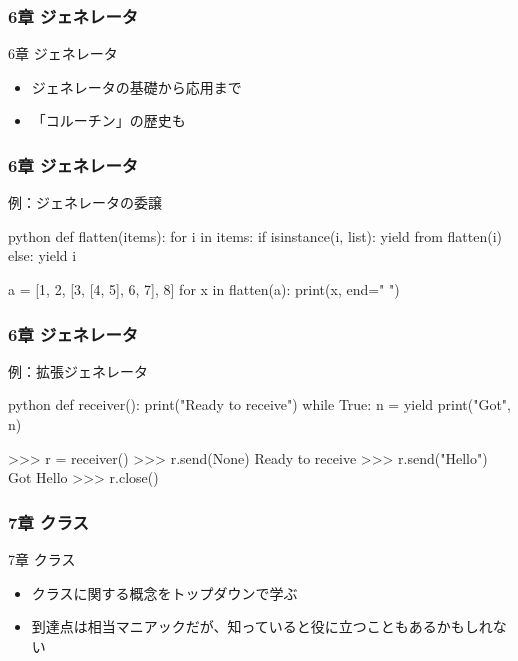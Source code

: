 \documentclass[aspectratio=169,dvipdfmx,12pt,notheorems]{beamer}
\theoremstyle{definition}
\begin{document}
\begin{frame}\frametitle{6章 ジェネレータ}

\begin{block}{6章 ジェネレータ}
\begin{itemize}
\item ジェネレータの基礎から応用まで
\item 「コルーチン」の歴史も
\end{itemize}
\end{block}

\end{frame}

\begin{frame}[fragile]\frametitle{6章 ジェネレータ}

\begin{exampleblock}{例：ジェネレータの委譲}
\begin{pygments}{python}    
def flatten(items):
    for i in items:
        if isinstance(i, list):
            yield from flatten(i)
        else:
            yield i

a = [1, 2, [3, [4, 5], 6, 7], 8]
for x in flatten(a):
    print(x, end=" ")
\end{pygments}
\end{exampleblock}

\end{frame}

\begin{frame}[fragile]\frametitle{6章 ジェネレータ}

\begin{exampleblock}{例：拡張ジェネレータ}
\begin{pygments}{python}    
def receiver():
    print("Ready to receive")
    while True:
        n = yield
        print("Got", n)

>>> r = receiver()
>>> r.send(None)
Ready to receive
>>> r.send("Hello")
Got Hello
>>> r.close()
\end{pygments}
\end{exampleblock}

\end{frame}

\begin{frame}\frametitle{7章 クラス}

\begin{block}{7章 クラス}
\begin{itemize}
\item クラスに関する概念をトップダウンで学ぶ
\item 到達点は相当マニアックだが、知っていると役に立つこともあるかもしれない
\end{itemize}
\end{block}

\end{frame}
\end{document}
